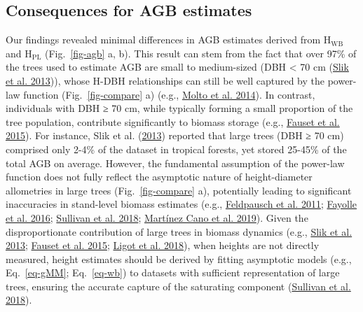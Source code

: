 \documentclass[
  12pt,
  letterpaper,
  DIV=11,
  numbers=noendperiod]{scrartcl}
\begin{document}
\hypertarget{consequences-for-agb-estimates}{%
\subsection{Consequences for AGB
estimates}\label{consequences-for-agb-estimates}}

Our findings revealed minimal differences in AGB estimates derived from
\(\text{H}_\text{WB}\) and \(\text{H}_\text{PL}\) (Fig.~\ref{fig-agb} a,
b). This result can stem from the fact that over 97\% of the trees used
to estimate AGB are small to medium-sized (DBH \textless{} 70 cm
(\protect\hyperlink{ref-Slik2013}{Slik et al. 2013})), whose H-DBH
relationships can still be well captured by the power-law function
(Fig.~\ref{fig-compare} a) (e.g.,
\protect\hyperlink{ref-Molto2014}{Molto et al. 2014}). In contrast,
individuals with DBH ≥ 70 cm, while typically forming a small proportion
of the tree population, contribute significantly to biomass storage
(e.g., \protect\hyperlink{ref-Fauset2015}{Fauset et al. 2015}). For
instance, Slik et al. (\protect\hyperlink{ref-Slik2013}{2013}) reported
that large trees (DBH ≥ 70 cm) comprised only 2-4\% of the dataset in
tropical forests, yet stored 25-45\% of the total AGB on average.
However, the fundamental assumption of the power-law function does not
fully reflect the asymptotic nature of height-diameter allometries in
large trees (Fig.~\ref{fig-compare} a), potentially leading to
significant inaccuracies in stand-level biomass estimates (e.g.,
\protect\hyperlink{ref-Feldpausch2011}{Feldpausch et al. 2011};
\protect\hyperlink{ref-Fayolle2016}{Fayolle et al. 2016};
\protect\hyperlink{ref-Sullivan2018}{Sullivan et al. 2018};
\protect\hyperlink{ref-MartinezCano2019}{Martínez Cano et al. 2019}).
Given the disproportionate contribution of large trees in biomass
dynamics (e.g., \protect\hyperlink{ref-Slik2013}{Slik et al. 2013};
\protect\hyperlink{ref-Fauset2015}{Fauset et al. 2015};
\protect\hyperlink{ref-Ligot2018}{Ligot et al. 2018}), when heights are
not directly measured, height estimates should be derived by fitting
asymptotic models (e.g., Eq.~\ref{eq-gMM}; Eq.~\ref{eq-wb}) to datasets
with sufficient representation of large trees, ensuring the accurate
capture of the saturating component
(\protect\hyperlink{ref-Sullivan2018}{Sullivan et al. 2018}).
\end{document}
